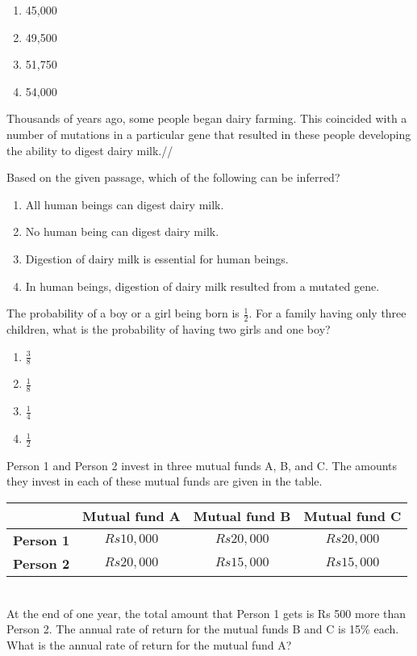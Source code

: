 \begin{enumerate}
    \item 45,000
    \item 49,500
    \item 51,750
    \item 54,000
\end{enumerate}
\item Thousands of years ago, some people began dairy farming. This coincided with a number of mutations in a particular gene that resulted in these people developing the ability to digest dairy milk.//


Based on the given passage, which of the following can be inferred?
\begin{enumerate}
    \item All human beings can digest dairy milk.
    \item No human being can digest dairy milk.
    \item Digestion of dairy milk is essential for human beings.
    \item In human beings, digestion of dairy milk resulted from a mutated gene.
\end{enumerate}
\item The probability of a boy or a girl being born is $ \frac{1}{2} $. For a family having only three children, what is the probability of having two girls and one boy?
\begin{enumerate}
    \item $ \frac{3}{8} $
    \item $ \frac{1}{8} $
    \item $ \frac{1}{4} $
    \item $ \frac{1}{2} $
\end{enumerate}
\item Person 1 and Person 2 invest in three mutual funds A, B, and C. The amounts they invest in each of these mutual funds are given in the table.\\
\begin{table}[h!]
\centering
\begin{tabular}{|c|c|c|c|}
\hline
                & \textbf{Mutual fund A} & \textbf{Mutual fund B} & \textbf{Mutual fund C} \\ \hline
\textbf{Person 1} & \(Rs 10,000\)          & \(Rs 20,000\)          & \(Rs 20,000\)          \\ \hline
\textbf{Person 2} & \(Rs 20,000\)          & \(Rs 15,000\)          & \(Rs 15,000\)          \\ \hline
\end{tabular}
\end{table}\\
At the end of one year, the total amount that Person 1 gets is Rs 500 more than Person 2. The annual rate of return for the mutual funds B and C is 15\% each. What is the annual rate of return for the mutual fund A?


